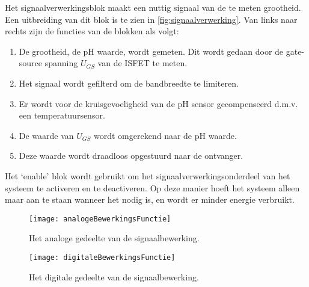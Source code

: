 
Het signaalverwerkingsblok maakt een nuttig signaal van de te meten grootheid. Een uitbreiding van dit blok is te zien in \cref{fig:signaalverwerking}.
Van links naar rechts zijn de functies van de blokken als volgt:
\begin{enumerate}
    \item De grootheid, de pH waarde, wordt gemeten. Dit wordt gedaan door de gate-source spanning $U_{GS}$ van de ISFET te meten.
    \item Het signaal wordt gefilterd om de bandbreedte te limiteren.
    \item Er wordt voor de kruisgevoeligheid van de pH sensor gecompenseerd d.m.v. een temperatuursensor.
    \item De waarde van $U_{GS}$ wordt omgerekend naar de pH waarde.
    \item Deze waarde wordt draadloos opgestuurd naar de ontvanger.
\end{enumerate}
Het `enable' blok wordt gebruikt om het signaalverwerkingsonderdeel van het systeem te activeren en te deactiveren. Op deze manier hoeft het systeem alleen maar aan te staan wanneer het nodig is, en wordt er minder energie verbruikt.




\begin{figure}[!htbp]
    \centering
    \texttt{[image: analogeBewerkingsFunctie]}
    \caption{Het analoge gedeelte van de signaalbewerking.}
    \label{fig:analogeBewerkingsFunctie}
\end{figure}


\begin{figure}[!htbp]
    \centering
    \texttt{[image: digitaleBewerkingsFunctie]}
    \caption{Het digitale gedeelte van de signaalbewerking.}
    \label{fig:digitaleBewerkingsFunctie}
\end{figure}



